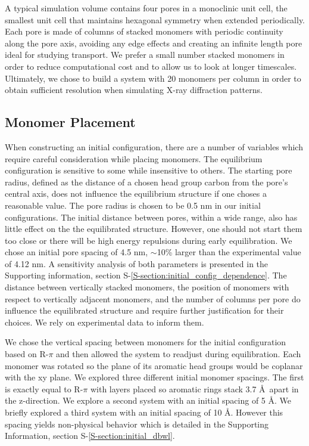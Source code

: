 \documentclass[journal=jpcbfk,manusciprt=article]{achemso}
\begin{document}
  A typical simulation volume contains four pores in a monoclinic unit cell,
  the smallest unit cell that maintains hexagonal symmetry when extended
  periodically. Each pore is made of columns of stacked monomers with periodic
  continuity along the pore axis, avoiding any edge effects and creating an
  infinite length pore ideal for studying transport. We prefer a small number stacked
  monomers in order to reduce computational cost and to allow us to look at
  longer timescales. Ultimately, we chose to build a system with 20 monomers
  per column in order to obtain sufficient resolution when simulating
  X-ray diffraction patterns. %
 
  \subsection{Monomer Placement} 

  When constructing an initial configuration, there are a number of variables
  which require careful consideration while placing monomers. The equilibrium
  configuration is sensitive to some while insensitive to others. The starting
  pore radius, defined as the distance of a chosen head group carbon from the
  pore's central axis, does not influence the equilibrium structure if one choses
  a reasonable value. The pore radius is chosen to be 0.5 nm in our initial
  configurations. The initial distance between pores, within a wide range, also has 
  little effect on the the equilibrated structure. However, one should not start them
  too close or there will be high energy repulsions during early equilibration. We 
  chose an initial pore spacing of 4.5 nm, $\sim$10\% larger than the experimental value
  of 4.12 nm. A sensitivity analysis of both parameters is presented in the 
  Supporting information, section S-\ref{S-section:initial_config_dependence}. The 
  distance between vertically stacked monomers, the position of monomers with respect 
  to vertically adjacent monomers, and the number of columns per pore do influence the 
  equilibrated structure and require further justification for their choices. We rely on 
  experimental data to inform them. 

  We chose the vertical spacing between monomers for the initial configuration based
  on R-$\pi$ and then allowed the system to readjust during equilibration. Each monomer was
  rotated so the plane of its aromatic head groups would be coplanar with the xy plane. We
  explored three different initial monomer spacings. The first is exactly
  equal to R-$\pi$ with layers placed so aromatic rings stack 3.7 \AA~apart in
  the z-direction. We explore a second system with an initial spacing of 5
  \AA. We briefly explored a third system with an initial spacing of 10
  \AA. However this spacing yields non-physical behavior which is detailed in the 
  Supporting Information, section S-\ref{S-section:initial_dbwl}. 
\end{document}
